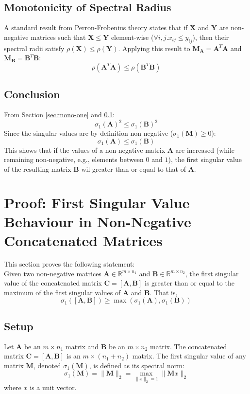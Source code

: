 \subsection{Monotonicity of Spectral Radius}
\label{sec:mono-three}
A standard result from Perron-Frobenius theory states that if $\mathbf{X}$ and
$\mathbf{Y}$ are non-negative matrices such that $\mathbf{X} \leq \mathbf{Y}$
element-wise ($\forall i,j. x_{ij} \leq y_{ij}$), then their spectral radii satisfy $\rho(\mathbf{X}) \leq
\rho(\mathbf{Y})$. Applying this result to $\mathbf{M}_{\mathbf{A}} =
\mathbf{A}^T\mathbf{A}$ and $\mathbf{M}_{\mathbf{B}} =
\mathbf{B}^T\mathbf{B}$:
\[ \rho(\mathbf{A}^T\mathbf{A}) \leq \rho(\mathbf{B}^T\mathbf{B}) \]

\subsection{Conclusion}
From Section \ref{sec:mono-one} and \ref{sec:mono-three}:
\[ \sigma_1(\mathbf{A})^2 \leq \sigma_1(\mathbf{B})^2 \]
Since the singular values are by definition non-negative ($\sigma_1(\mathbf{M})
\geq 0$):
\[ \sigma_1(\mathbf{A}) \leq \sigma_1(\mathbf{B}) \]
This shows that if the values of a non-negative matrix $\mathbf{A}$ are
increased (while remaining non-negative, e.g., elements between $0$ and $1$),
the first singular value of the resulting matrix $\mathbf{B}$ wil greater than
or equal to that of $\mathbf{A}$.

\section{Proof: First Singular Value Behaviour in Non-Negative Concatenated
Matrices}
\label{sec:app-concatenate}
This section proves the following statement:\\
Given two non-negative matrices $\mathbf{A} \in \mathbb{R}^{m \times n_1}$ and
$\mathbf{B} \in \mathbb{R}^{m \times n_2}$, the first singular value of the
concatenated matrix $\mathbf{C} = [\mathbf{A}, \mathbf{B}]$ is greater than or
equal to the maximum of the first singular values of $\mathbf{A}$ and
$\mathbf{B}$. That is,
\[ \sigma_1([\mathbf{A}, \mathbf{B}]) \geq \max(\sigma_1(\mathbf{A}),
\sigma_1(\mathbf{B})) \]

\subsection{Setup}
Let $\mathbf{A}$ be an $m \times n_1$ matrix and $\mathbf{B}$ be an $m \times
n_2$ matrix. The concatenated matrix $\mathbf{C} = [\mathbf{A}, \mathbf{B}]$ is
an $m \times (n_1 + n_2)$ matrix. The first singular value of any matrix
$\mathbf{M}$, denoted $\sigma_1(\mathbf{M})$, is defined as its spectral norm:
\[ \sigma_1(\mathbf{M}) = \parallel \mathbf{M} \parallel_2 = \max_{\parallel x
\parallel_2 = 1} \parallel \mathbf{M}x \parallel_2 \]
where $x$ is a unit vector.

